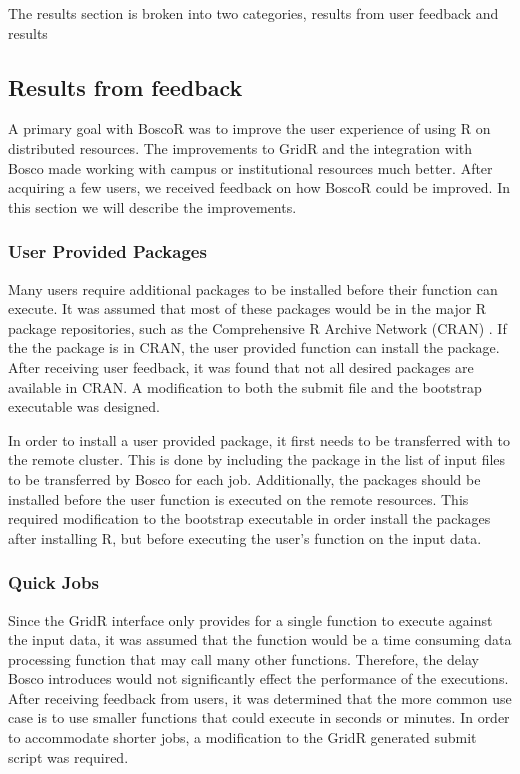 \documentclass[conference]{IEEEtran}
\begin{document}
The results section is broken into two categories, results from user feedback and results 

\subsection{Results from feedback}

A primary goal with BoscoR was to improve the user experience of using R on distributed resources.  The improvements to GridR and the integration with Bosco made working with campus or institutional resources much better. After acquiring a few users, we received feedback on how BoscoR could be improved.  In this section we will describe the improvements.

\subsubsection{User Provided Packages}

Many users require additional packages to be installed before their function can execute.  It was assumed that most of these packages would be in the major R package repositories, such as the Comprehensive R Archive Network (CRAN) \cite{cran}.  If the the package is in CRAN, the user provided function can install the package.  After receiving user feedback, it was found that not all desired packages are available in CRAN.  A modification to both the submit file and the bootstrap executable was designed.

In order to install a user provided package, it first needs to be transferred with to the remote cluster.  This is done by including the package in the list of input files to be transferred by Bosco for each job.  Additionally, the packages should be installed before the user function is executed on the remote resources.  This required modification to the bootstrap executable in order install the packages after installing R, but before executing the user's function on the input data.

\subsubsection{Quick Jobs}
Since the GridR interface only provides for a single function to execute against the input data, it was assumed that the function would be a time consuming data processing function that may call many other functions.  Therefore, the delay Bosco introduces would not significantly effect the performance of the executions.  After receiving feedback from users, it was determined that the more common use case is to use smaller functions that could execute in seconds or minutes.  In order to accommodate shorter jobs, a modification to the GridR generated submit script was required.
\end{document}
